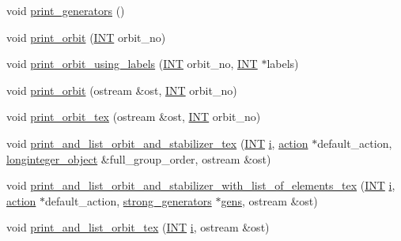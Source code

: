 \begin{DoxyCompactItemize}
void \mbox{\hyperlink{classschreier_ac9fce8f85082d0bc5b4f5b8b18a99bab}{print\+\_\+generators}} ()
\item 
void \mbox{\hyperlink{classschreier_ac30bbfe09706ff8ccaf27c2cf8074594}{print\+\_\+orbit}} (\mbox{\hyperlink{galois_8h_a09fddde158a3a20bd2dcadb609de11dc}{I\+NT}} orbit\+\_\+no)
\item 
void \mbox{\hyperlink{classschreier_ac8caf93e9b865d690e01b3faf74d0200}{print\+\_\+orbit\+\_\+using\+\_\+labels}} (\mbox{\hyperlink{galois_8h_a09fddde158a3a20bd2dcadb609de11dc}{I\+NT}} orbit\+\_\+no, \mbox{\hyperlink{galois_8h_a09fddde158a3a20bd2dcadb609de11dc}{I\+NT}} $\ast$labels)
\item 
void \mbox{\hyperlink{classschreier_af169ab35e35d07487771103a78e57222}{print\+\_\+orbit}} (ostream \&ost, \mbox{\hyperlink{galois_8h_a09fddde158a3a20bd2dcadb609de11dc}{I\+NT}} orbit\+\_\+no)
\item 
void \mbox{\hyperlink{classschreier_a9a93cee225ebf0f971afb10255422158}{print\+\_\+orbit\+\_\+tex}} (ostream \&ost, \mbox{\hyperlink{galois_8h_a09fddde158a3a20bd2dcadb609de11dc}{I\+NT}} orbit\+\_\+no)
\item 
void \mbox{\hyperlink{classschreier_a52098502f3919b9b57e1ebb4feba42bb}{print\+\_\+and\+\_\+list\+\_\+orbit\+\_\+and\+\_\+stabilizer\+\_\+tex}} (\mbox{\hyperlink{galois_8h_a09fddde158a3a20bd2dcadb609de11dc}{I\+NT}} \mbox{\hyperlink{alphabet2_8_c_acb559820d9ca11295b4500f179ef6392}{i}}, \mbox{\hyperlink{classaction}{action}} $\ast$default\+\_\+action, \mbox{\hyperlink{classlonginteger__object}{longinteger\+\_\+object}} \&full\+\_\+group\+\_\+order, ostream \&ost)
\item 
void \mbox{\hyperlink{classschreier_a6e37f40487e0dc0941ebb36d9250a4c5}{print\+\_\+and\+\_\+list\+\_\+orbit\+\_\+and\+\_\+stabilizer\+\_\+with\+\_\+list\+\_\+of\+\_\+elements\+\_\+tex}} (\mbox{\hyperlink{galois_8h_a09fddde158a3a20bd2dcadb609de11dc}{I\+NT}} \mbox{\hyperlink{alphabet2_8_c_acb559820d9ca11295b4500f179ef6392}{i}}, \mbox{\hyperlink{classaction}{action}} $\ast$default\+\_\+action, \mbox{\hyperlink{classstrong__generators}{strong\+\_\+generators}} $\ast$\mbox{\hyperlink{classschreier_af3dfc4e56f55faa3981755aec24bde82}{gens}}, ostream \&ost)
\item 
void \mbox{\hyperlink{classschreier_a6b87dc5584850a7397821f144c1598d6}{print\+\_\+and\+\_\+list\+\_\+orbit\+\_\+tex}} (\mbox{\hyperlink{galois_8h_a09fddde158a3a20bd2dcadb609de11dc}{I\+NT}} \mbox{\hyperlink{alphabet2_8_c_acb559820d9ca11295b4500f179ef6392}{i}}, ostream \&ost)
\item 

\end{DoxyCompactItemize}
